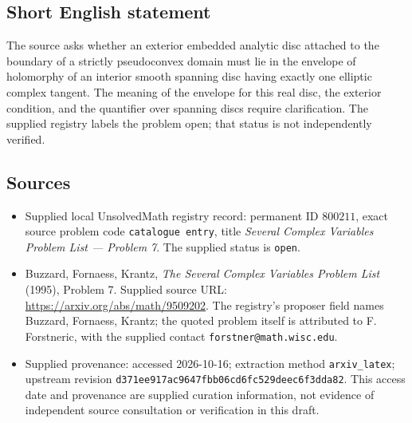 \documentclass[11pt]{article}
\begin{document}
\subsection{Short English statement}
The source asks whether an exterior embedded analytic disc attached to the boundary of a strictly pseudoconvex domain must lie in the envelope of holomorphy of an interior smooth spanning disc having exactly one elliptic complex tangent. The meaning of the envelope for this real disc, the exterior condition, and the quantifier over spanning discs require clarification. The supplied registry labels the problem open; that status is not independently verified.
\subsection{Sources}
\begin{itemize}
\item Supplied local UnsolvedMath registry record: permanent ID \(800211\), exact source problem code \texttt{catalogue entry}, title \emph{Several Complex Variables Problem List --- Problem 7}. The supplied status is \texttt{open}.
\item Buzzard, Fornaess, Krantz, \emph{The Several Complex Variables Problem List} (1995), Problem 7. Supplied source URL: \url{https://arxiv.org/abs/math/9509202}. The registry's proposer field names Buzzard, Fornaess, Krantz; the quoted problem itself is attributed to F. Forstneric, with the supplied contact \texttt{forstner@math.wisc.edu}.
\item Supplied provenance: accessed 2026-10-16; extraction method \texttt{arxiv\_latex}; upstream revision \texttt{d371ee917ac9647fbb06cd6fc529deec6f3dda82}. This access date and provenance are supplied curation information, not evidence of independent source consultation or verification in this draft.
\end{itemize}
\end{document}
